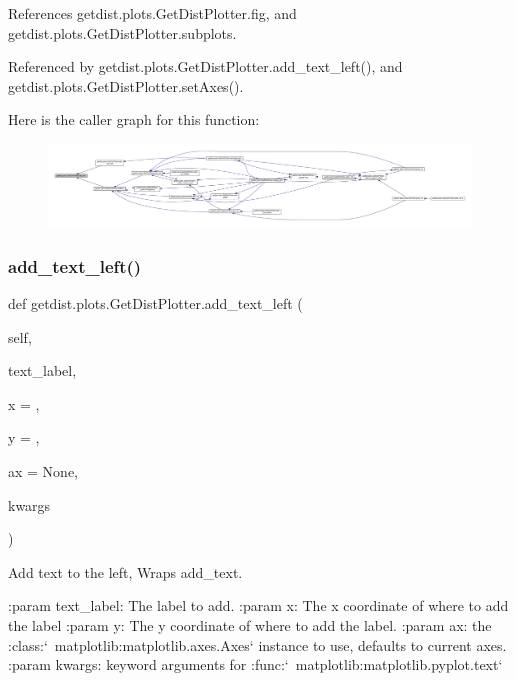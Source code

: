References getdist.\+plots.\+Get\+Dist\+Plotter.\+fig, and getdist.\+plots.\+Get\+Dist\+Plotter.\+subplots.



Referenced by getdist.\+plots.\+Get\+Dist\+Plotter.\+add\+\_\+text\+\_\+left(), and getdist.\+plots.\+Get\+Dist\+Plotter.\+set\+Axes().

Here is the caller graph for this function\+:
\nopagebreak
\begin{figure}[H]
\begin{center}
\leavevmode
\includegraphics[width=350pt]{classgetdist_1_1plots_1_1GetDistPlotter_a3508bf76855c92e7e9129377b76ee390_icgraph}
\end{center}
\end{figure}
\mbox{\label{classgetdist_1_1plots_1_1GetDistPlotter_af147d1c8013996cd850d66e5c2b82df7}} 
\subsubsection{\texorpdfstring{add\+\_\+text\+\_\+left()}{add\_text\_left()}}
{\footnotesize\ttfamily def getdist.\+plots.\+Get\+Dist\+Plotter.\+add\+\_\+text\+\_\+left (\begin{DoxyParamCaption}\item[{}]{self,  }\item[{}]{text\+\_\+label,  }\item[{}]{x = {},  }\item[{}]{y = {},  }\item[{}]{ax = {\ttfamily None},  }\item[{}]{kwargs }\end{DoxyParamCaption})}

\begin{DoxyVerb}Add text to the left, Wraps add_text.

:param text_label: The label to add.
:param x: The x coordinate of where to add the label
:param y: The y coordinate of where to add the label.
:param ax: the :class:`~matplotlib:matplotlib.axes.Axes` instance to use, defaults to current axes.
:param kwargs: keyword arguments for :func:`~matplotlib:matplotlib.pyplot.text` 
\end{DoxyVerb}
 

